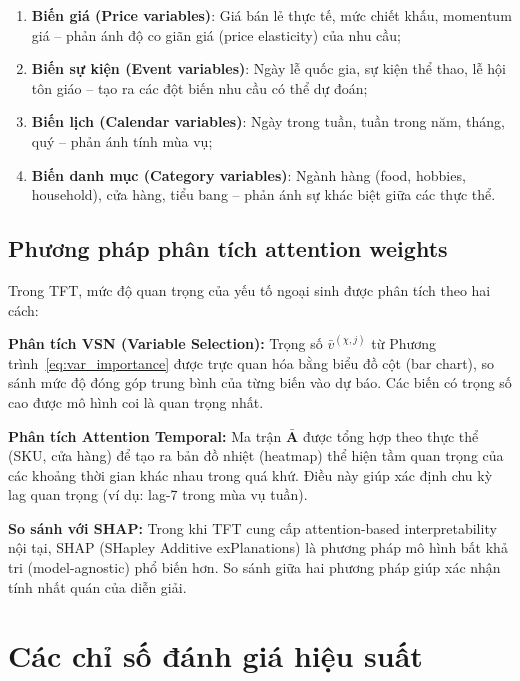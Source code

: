 \begin{enumerate}
    \item \textbf{Biến giá (Price variables)}: Giá bán lẻ thực tế, mức chiết khấu, momentum giá -- phản ánh độ co giãn giá (price elasticity) của nhu cầu;
    \item \textbf{Biến sự kiện (Event variables)}: Ngày lễ quốc gia, sự kiện thể thao, lễ hội tôn giáo -- tạo ra các đột biến nhu cầu có thể dự đoán;
    \item \textbf{Biến lịch (Calendar variables)}: Ngày trong tuần, tuần trong năm, tháng, quý -- phản ánh tính mùa vụ;
    \item \textbf{Biến danh mục (Category variables)}: Ngành hàng (food, hobbies, household), cửa hàng, tiểu bang -- phản ánh sự khác biệt giữa các thực thể.
\end{enumerate}

\subsection{Phương pháp phân tích attention weights}
\label{subsec:attention_analysis}

Trong TFT, mức độ quan trọng của yếu tố ngoại sinh được phân tích theo hai cách:

\textbf{Phân tích VSN (Variable Selection):}
Trọng số $\bar{v}^{(\chi,j)}$ từ Phương trình~\ref{eq:var_importance} được trực quan hóa bằng biểu đồ cột (bar chart), so sánh mức độ đóng góp trung bình của từng biến vào dự báo. Các biến có trọng số cao được mô hình coi là quan trọng nhất.

\textbf{Phân tích Attention Temporal:}
Ma trận $\bar{\mathbf{A}}$ được tổng hợp theo thực thể (SKU, cửa hàng) để tạo ra bản đồ nhiệt (heatmap) thể hiện tầm quan trọng của các khoảng thời gian khác nhau trong quá khứ. Điều này giúp xác định chu kỳ lag quan trọng (ví dụ: lag-7 trong mùa vụ tuần).

\textbf{So sánh với SHAP:}
Trong khi TFT cung cấp attention-based interpretability nội tại, SHAP (SHapley Additive exPlanations) \citep{lundberg2017unified} là phương pháp mô hình bất khả tri (model-agnostic) phổ biến hơn. So sánh giữa hai phương pháp giúp xác nhận tính nhất quán của diễn giải.

\section{Các chỉ số đánh giá hiệu suất}
\label{sec:chi_so_danh_gia}

